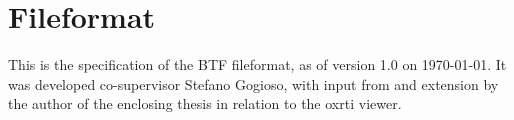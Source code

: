 \newpage
\appendix
\section{Fileformat}\label{sec_fileformat}
This is the specification of the BTF fileformat, as of version 1.0 on \today.
It was developed co-supervisor Stefano Gogioso, with input from and extension by
the author of the enclosing thesis in relation to the oxrti viewer.

\newpage
\printbibliography
